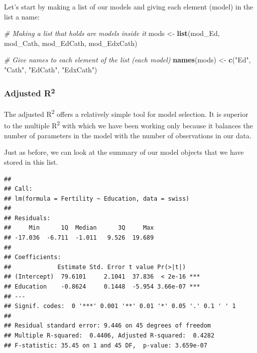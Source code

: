 \documentclass[
]{book}
\newenvironment{Shaded}{\begin{snugshade}}{\end{snugshade}}
\newcommand{\CommentTok}[1]{\textcolor[rgb]{0.56,0.35,0.01}{\textit{#1}}}
\newcommand{\KeywordTok}[1]{\textcolor[rgb]{0.13,0.29,0.53}{\textbf{#1}}}
\newcommand{\NormalTok}[1]{#1}
\newcommand{\OperatorTok}[1]{\textcolor[rgb]{0.81,0.36,0.00}{\textbf{#1}}}
\newcommand{\StringTok}[1]{\textcolor[rgb]{0.31,0.60,0.02}{#1}}
\begin{document}
Let's start by making a list of our models and giving each element (model) in the list a name:

\begin{Shaded}
\begin{Highlighting}[]
\CommentTok{# Making a list that holds are models inside it}
\NormalTok{mods <-}\StringTok{ }\KeywordTok{list}\NormalTok{(mod_Ed, mod_Cath, mod_EdCath, mod_EdxCath)}

\CommentTok{# Give names to each element of the list (each model)}
\KeywordTok{names}\NormalTok{(mods) <-}\StringTok{ }\KeywordTok{c}\NormalTok{(}\StringTok{"Ed"}\NormalTok{, }\StringTok{"Cath"}\NormalTok{, }\StringTok{"EdCath"}\NormalTok{, }\StringTok{"EdxCath"}\NormalTok{)}
\end{Highlighting}
\end{Shaded}

\hypertarget{adjusted-r2}{%
\subsubsection{\texorpdfstring{Adjusted R\textsuperscript{2}}{Adjusted R2}}\label{adjusted-r2}}

The adjusted R\textsuperscript{2} offers a relatively simple tool for model selection. It is superior to the multiple R\textsuperscript{2} with which we have been working only because it balances the number of parameters in the model with the number of observations in our data.

Just as before, we can look at the summary of our model objects that we have stored in this list.

\begin{Shaded}
\end{Shaded}

\begin{verbatim}
## 
## Call:
## lm(formula = Fertility ~ Education, data = swiss)
## 
## Residuals:
##     Min      1Q  Median      3Q     Max 
## -17.036  -6.711  -1.011   9.526  19.689 
## 
## Coefficients:
##             Estimate Std. Error t value Pr(>|t|)    
## (Intercept)  79.6101     2.1041  37.836  < 2e-16 ***
## Education    -0.8624     0.1448  -5.954 3.66e-07 ***
## ---
## Signif. codes:  0 '***' 0.001 '**' 0.01 '*' 0.05 '.' 0.1 ' ' 1
## 
## Residual standard error: 9.446 on 45 degrees of freedom
## Multiple R-squared:  0.4406,	Adjusted R-squared:  0.4282 
## F-statistic: 35.45 on 1 and 45 DF,  p-value: 3.659e-07
\end{verbatim}
\end{document}
